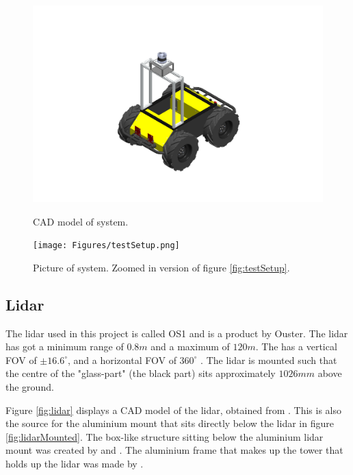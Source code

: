 \begin{figure}[H]
    \centering
    \begin{minipage}[b]{0.49\textwidth}
        \includegraphics[width=\textwidth,trim={ 7.5cm 2.5cm 7.5cm 5cm},clip]{Figures/CAD/huskyWithSensors.PNG}
        \caption{CAD model of system.}
        \label{fig:huskyWithSensors}
    \end{minipage}
    \begin{minipage}[b]{0.49\textwidth}
        \texttt{[image: Figures/testSetup.png]}
        \caption{Picture of system. Zoomed in version of figure \ref{fig:testSetup}.}
        \label{fig:testSetupClose}
    \end{minipage}
\end{figure}

\subsection{Lidar}\label{subsec:Lidar}
The lidar used in this project is called OS1 and is a product by Ouster. The lidar has got a minimum range of $0.8 m$ and a maximum of $120 m$. The has a vertical FOV of $\pm 16.6 ^\circ$, and a horizontal FOV of $360 ^\circ$ \cite{ousterOS1datasheet}. The lidar is mounted such that the centre of the "glass-part" (the black part) sits approximately $1026 mm$ above the ground. 

Figure \ref{fig:lidar} displays a CAD model of the lidar, obtained from \cite{ouster-download}. This is also the source for the aluminium mount that sits directly below the lidar in figure \ref{fig:lidarMounted}. The box-like structure sitting below the aluminium lidar mount was created by \cite{muggerud2023} and \cite{ovsthus2023}. The aluminium frame that makes up the tower that holds up the lidar was made by \cite{ovsthus2023}. 

